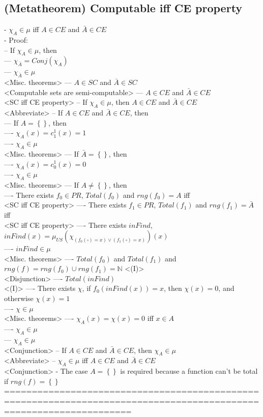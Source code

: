 \documentclass{book}
\newcommand{\inot}{\not}
\newcommand{\placeholder}{\square}
\newcommand{\set}[1]{\left\{ #1 \right\}}
\begin{document}
\subsection{(Metatheorem) Computable iff CE property} %
	- $\chi_A \in \mu$ iff $A \in CE$ and $\bar{A} \in CE$ \\
	- Proof: \\
		-- If $\chi_A \in \mu$, then \\
			--- $\chi_{\bar{A}} = Conj(\chi_A)$ \\
			--- $\chi_{\bar{A}} \in \mu$ \\ <Misc. theorems>
			--- $A \in SC$ and $\bar{A} \in SC$ \\ <Computable sets are semi-computable>
			--- $A \in CE$ and $\bar{A} \in CE$ \\ <SC iff CE property>
		-- If $\chi_A \in \mu$, then $A \in CE$ and $\bar{A} \in CE$ \\ <Abbreviate>
		-- If $A \in CE$ and $\bar{A} \in CE$, then \\
			--- If $A = \set{}$, then \\
				---- $\chi_{A}(x) = c_1^1(x) = 1$ \\
				---- $\chi_{A} \in \mu$ \\ <Misc. theorems>
			--- If $\bar{A} = \set{}$, then \\
				---- $\chi_{A}(x) = c_0^1(x) = 0$ \\
				---- $\chi_{A} \in \mu$ \\ <Misc. theorems>
			--- If $A \inot = \set{}$, then \\
				---- There exists $f_0 \in PR$, $Total(f_0)$ and $rng(f_0) = A$ iff \\ <SC iff CE property>
				---- There exists $f_1 \in PR$, $Total(f_1)$ and $rng(f_1) = \bar{A}$ iff \\ <SC iff CE property>
				---- There exists $inFind$, $inFind(x) = \mu_{US}(\chi_{(f_0(\placeholder) = x) \lor (f_1(\placeholder) = x)})(x)$ \\
				---- $inFind \in \mu$ \\ <Misc. theorems>
				---- $Total(f_0)$ and $Total(f_1)$ and $rng(f) = rng(f_0) \cup rng(f_1) = \mathbb{N}$ <(I)> \\ <Disjunction>
				---- $Total(inFind)$ \\ <(I)>
				---- There exists $\chi$, if $f_0(inFind(x)) = x$, then $\chi(x) = 0$, and otherwise $\chi(x) = 1$ \\
				---- $\chi \in \mu$ \\ <Misc. theorems>
				---- $\chi_{A}(x) = \chi(x) = 0$ iff $x \in A$ \\
				---- $\chi_{A} \in \mu$ \\
			--- $\chi_{A} \in \mu$ \\ <Conjunction>
		-- If $A \in CE$ and $\bar{A} \in CE$, then $\chi_A \in \mu$ \\ <Abbreviate>
		-- $\chi_A \in \mu$ iff $A \in CE$ and $\bar{A} \in CE$ \\ <Conjunction>
	- The case $A = \set{}$ is required because a function can't be total if $rng(f) = \set{}$ \\
	===================================================================================================================
\end{document}
